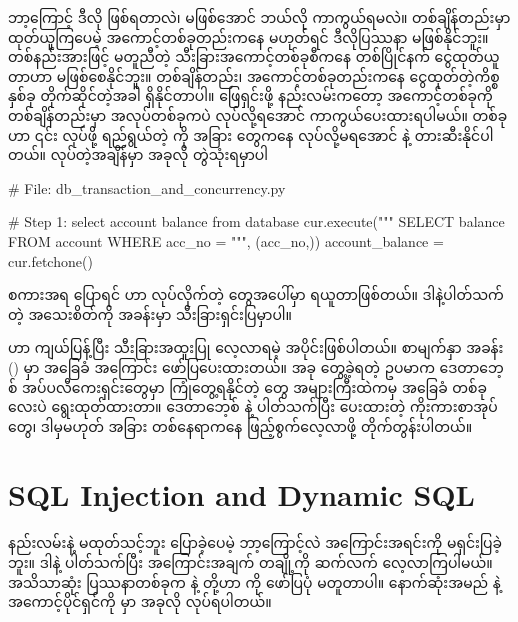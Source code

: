 ဘာ့ကြောင့် ဒီလို ဖြစ်ရတာလဲ၊ မဖြစ်အောင် ဘယ်လို ကာကွယ်ရမလဲ။ တစ်ချိန်တည်းမှာ ထုတ်ယူကြပေမဲ့ အကောင့်တစ်ခုတည်းကနေ မဟုတ်ရင်  ဒီလိုပြဿနာ မဖြစ်နိုင်ဘူး။ တစ်နည်းအားဖြင့် မတူညီတဲ့ သီးခြားအကောင့်တစ်ခုစီကနေ တစ်ပြိုင်နက် ငွေထုတ်ယူတာဟာ  မဖြစ်စေနိုင်ဘူး။ တစ်ချိန်တည်း၊ အကောင့်တစ်ခုတည်းကနေ ငွေထုတ်တဲ့ကိစ္စနှစ်ခု တိုက်ဆိုင်တဲ့အခါ  ရှိနိုင်တာပါ။ ဖြေရှင်းဖို့ နည်းလမ်းကတော့ အကောင့်တစ်ခုကို တစ်ချိန်တည်းမှာ အလုပ်တစ်ခုကပဲ  လုပ်လို့ရအောင် ကာကွယ်ပေးထားရပါမယ်။  တစ်ခုဟာ ၎င်း  လုပ်ဖို့ ရည်ရွယ်တဲ့  ကို အခြား  တွေကနေ  လုပ်လို့မရအောင်  နဲ့ တားဆီးနိုင်ပါတယ်။  လုပ်တဲ့အချိန်မှာ အခုလို တွဲသုံးရမှာပါ    
%
\begin{py}
# File: db_transaction_and_concurrency.py

# Step 1: select account balance from database
cur.execute("""
    SELECT balance FROM account WHERE acc_no = %
""", (acc_no,))
account_balance = cur.fetchone()
\end{py}
% 
 စကားအရ ပြောရင်  ဟာ  လုပ်လိုက်တဲ့  တွေအပေါ်မှာ  ရယူတာဖြစ်တယ်။ ဒါနဲ့ပါတ်သက်တဲ့ အသေးစိတ်ကို  အခန်းမှာ သီးခြားရှင်းပြမှာပါ။ 

 ဟာ ကျယ်ပြန့်ပြီး သီးခြားအထူးပြု လေ့လာရမဲ့ အပိုင်းဖြစ်ပါတယ်။ စာမျက်နှာ \fRefNo{\pageref{ch:concurrency}} အခန်း (\fRefNo{\ref{ch:concurrency}}) မှာ အခြေခံ  အကြောင်း ဖော်ပြပေးထားတယ်။ အခု တွေ့ခဲ့ရတဲ့ ဥပမာက ဒေတာဘေ့စ် အပ်ပလီကေးရှင်းတွေမှာ ကြုံတွေ့ရနိုင်တဲ့  တွေ အများကြီးထဲကမှ အခြေခံ တစ်ခုလေးပဲ ရွေးထုတ်ထားတာ။ ဒေတာဘေ့စ်  နဲ့ ပါတ်သက်ပြီး ပေးထားတဲ့ ကိုးကားစာအုပ်တွေ၊ ဒါမှမဟုတ် အခြား တစ်နေရာကနေ ဖြည့်စွက်လေ့လာဖို့ တိုက်တွန်းပါတယ်။ 

\section{SQL Injection and Dynamic SQL}
 နည်းလမ်းနဲ့  မထုတ်သင့်ဘူး ပြောခဲ့ပေမဲ့ ဘာ့ကြောင့်လဲ အကြောင်းအရင်းကို မရှင်းပြခဲ့ဘူး။ ဒါနဲ့ ပါတ်သက်ပြီး အကြောင်းအချက် တချို့ကို ဆက်လက် လေ့လာကြပါမယ်။ အသိသာဆုံး ပြဿနာတစ်ခုက  နဲ့  တို့ဟာ  ကို ဖော်ပြပုံ မတူတာပါ။ နောက်ဆုံးအမည်  နဲ့ အကောင့်ပိုင်ရှင်ကို  မှာ အခုလို  လုပ်ရပါတယ်။ 

